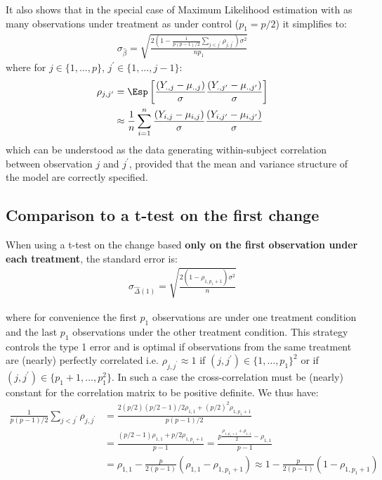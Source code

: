 \documentclass[12pt]{article}
\begin{document}
It also shows that in the special case of Maximum Likelihood
estimation with as many observations under treatment as under control
(\(p_1=p/2\)) it simplifies to:
\begin{align}
\sigma_{\widehat{\beta}} = \sqrt{\frac{2\left(1-\frac{1}{p(p-1)/2}\sum_{j < j^{\prime}} \rho_{j,j^{\prime}}\right) \sigma^2}{n p_1}} \label{eq:seML}
\end{align}
where for \(j \in \{1,\ldots,p\}\), \(j^{\prime} \in
  \{1,\ldots,j-1\}\):
\begin{align*}
\rho_{j,j^{\prime}} &= \Esp\left[\frac{(Y_{.,j}-\mu_{.,j})}{\sigma}\frac{(Y_{.,j^{\prime}}-\mu_{.,j^{\prime}})}{\sigma}\right] \\
                  &\approx \frac{1}{n}\sum_{i=1}^n \frac{(Y_{i,j}-\mu_{i,j})}{\sigma}\frac{(Y_{i,j^{\prime}}-\mu_{i,j^{\prime}})}{\sigma}
\end{align*}
which can be understood as the data generating within-subject
correlation between observation \(j\) and \(j^{\prime}\), provided
that the mean and variance structure of the model are correctly specified. 

\subsection{Comparison to a t-test on the first change}
\label{sec:org1db33ee}

When using a t-test on the change based \textbf{only on the first observation
under each treatment}, the standard error is:
\begin{align*}
\sigma_{\widehat{\Delta}(1)} = \sqrt{\frac{2(1-\rho_{1,p_1+1}) \sigma^2}{n}}
\end{align*}

where for convenience the first \(p_1\) observations are under one
treatment condition and the last \(p_1\) observations under the other
treatment condition. This strategy controls the type 1 error and is
optimal if observations from the same treatment are (nearly) perfectly
correlated i.e. \(\rho_{j,j^{\prime}} \approx 1\) if
\((j,j^{\prime})\in \{1,\ldots,p_1\}^2\) or if \((j,j^{\prime})\in
\{p_1+1,\ldots,p_1^2\}\). In such a case the cross-correlation must be
(nearly) constant for the correlation matrix to be positive
definite. We thus have:
\begin{align*}
\frac{1}{p(p-1)/2}\sum_{j < j^{\prime}} \rho_{j,j^{\prime}} &= \frac{2(p/2)(p/2-1)/2 \rho_{1,1} +(p/2)^2 \rho_{1,p_1+1}}{p(p-1)/2} \\
&= \frac{(p/2-1)\rho_{1,1}+p/2 \rho_{1,p_1+1}}{p-1} = \frac{p\frac{\rho_{1,p_1+1}+\rho_{1,1}}{2} - \rho_{1,1}}{p-1} \\
&= \rho_{1,1} - \frac{p}{2(p-1)}(\rho_{1,1}-\rho_{1,p_1+1}) \approx 1 - \frac{p}{2(p-1)}(1-\rho_{1,p_1+1})
\end{align*}
\end{document}
